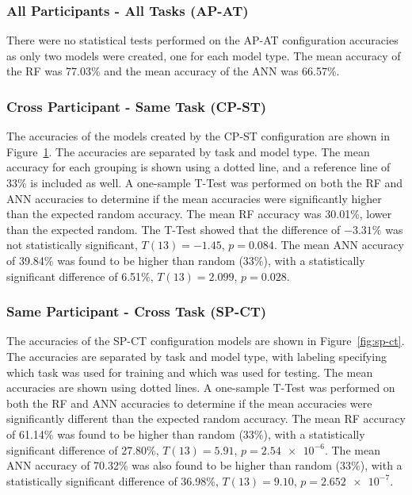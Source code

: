 \documentclass[11pt]{article}
\begin{document}
		\subsubsection{All Participants - All Tasks (AP-AT)}
		There were no statistical tests performed on the AP-AT configuration accuracies as only two models were created, one for each model type. The mean accuracy of the RF was 77.03\% and the mean accuracy of the ANN was 66.57\%.
		
		\subsubsection{Cross Participant - Same Task (CP-ST)}
		The accuracies of the models created by the CP-ST configuration are shown in Figure~\ref{fig:cp-st}. The accuracies are separated by task and model type. The mean accuracy for each grouping is shown using a dotted line, and a reference line of 33\% is included as well. A one-sample T-Test was performed on both the RF and ANN accuracies to determine if the mean accuracies were significantly higher than the expected random accuracy. The mean RF accuracy was 30.01\%, lower than the expected random. The T-Test showed that the difference of \(-3.31\%\) was not statistically significant, \(T(13) = -1.45\), \(p = 0.084\). The mean ANN accuracy of 39.84\% was found to be higher than random (33\%), with a statistically significant difference of 6.51\%, \(T(13) = 2.099\), \(p = 0.028\).
		\begin{figure}
		\centering
		\caption{}
		\label{fig:cp-st}
		\end{figure} 
		
		\subsubsection{Same Participant - Cross Task (SP-CT)}
		The accuracies of the SP-CT configuration models are shown in Figure~\ref{fig:sp-ct}. The accuracies are separated by task and model type, with labeling specifying which task was used for training and which was used for testing. The mean accuracies are shown using dotted lines. A one-sample T-Test was performed on both the RF and ANN accuracies to determine if the mean accuracies were significantly different than the expected random accuracy. The mean RF accuracy of 61.14\% was found to be higher than random (33\%), with a statistically significant difference of 27.80\%, \(T(13) = 5.91\), \(p = \num{2.54e-6}\). The mean ANN accuracy of 70.32\% was also found to be higher than random (33\%), with a statistically significant difference of 36.98\%, \(T(13) = 9.10\), \(p = \num{2.652e-7}\).
		
\end{document}
